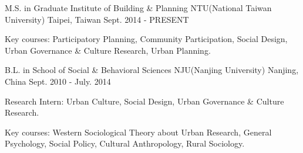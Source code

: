 \begin{cventries}
  \cventry
    {M.S. in Graduate Institute of Building \& Planning}
    {NTU(National Taiwan University)}
    {Taipei, Taiwan}
    {Sept. 2014 - PRESENT}
    {
      \begin{cvitems}
        \item {Key courses: Participatory Planning, Community Participation, Social Design, Urban Governance \& Culture Research, Urban Planning.}     
      \end{cvitems}
    }
  \cventry
    {B.L. in School of Social \& Behavioral Sciences}
    {NJU(Nanjing University)}
    {Nanjing, China}
    {Sept. 2010 - July. 2014}
    {
      \begin{cvitems}
 		\item {Research Intern: Urban Culture, Social Design, Urban Governance \&  Culture Research.}
        \item {Key courses: Western Sociological Theory about Urban Research, General Psychology, Social Policy, Cultural Anthropology, Rural Sociology.}        
      \end{cvitems}
    }
\end{cventries}
